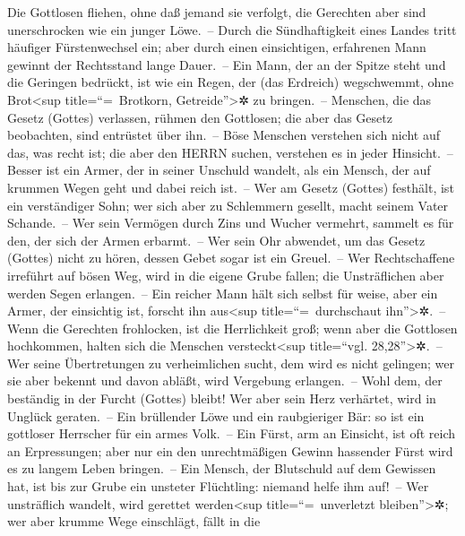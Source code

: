 Die Gottlosen fliehen, ohne daß jemand sie verfolgt, die
Gerechten aber sind unerschrocken wie ein junger Löwe.~--
Durch die Sündhaftigkeit eines Landes tritt häufiger
Fürstenwechsel ein; aber durch einen einsichtigen, erfahrenen Mann
gewinnt der Rechtsstand lange Dauer.~-- Ein Mann, der an
der Spitze steht und die Geringen bedrückt, ist wie ein Regen, der (das
Erdreich) wegschwemmt, ohne Brot\textless sup title=``=~Brotkorn,
Getreide''\textgreater✲ zu bringen.~-- Menschen, die das
Gesetz (Gottes) verlassen, rühmen den Gottlosen; die aber das Gesetz
beobachten, sind entrüstet über ihn.~-- Böse Menschen
verstehen sich nicht auf das, was recht ist; die aber den HERRN suchen,
verstehen es in jeder Hinsicht.~-- Besser ist ein Armer,
der in seiner Unschuld wandelt, als ein Mensch, der auf krummen Wegen
geht und dabei reich ist.~-- Wer am Gesetz (Gottes)
festhält, ist ein verständiger Sohn; wer sich aber zu Schlemmern
gesellt, macht seinem Vater Schande.~-- Wer sein Vermögen
durch Zins und Wucher vermehrt, sammelt es für den, der sich der Armen
erbarmt.~-- Wer sein Ohr abwendet, um das Gesetz (Gottes)
nicht zu hören, dessen Gebet sogar ist ein Greuel.~-- Wer
Rechtschaffene irreführt auf bösen Weg, wird in die eigene Grube fallen;
die Unsträflichen aber werden Segen erlangen.~-- Ein
reicher Mann hält sich selbst für weise, aber ein Armer, der einsichtig
ist, forscht ihn aus\textless sup title=``=~durchschaut
ihn''\textgreater✲.~-- Wenn die Gerechten frohlocken, ist
die Herrlichkeit groß; wenn aber die Gottlosen hochkommen, halten sich
die Menschen versteckt\textless sup title=``vgl.
28,28''\textgreater✲.~-- Wer seine Übertretungen zu
verheimlichen sucht, dem wird es nicht gelingen; wer sie aber bekennt
und davon abläßt, wird Vergebung erlangen.~-- Wohl dem,
der beständig in der Furcht (Gottes) bleibt! Wer aber sein Herz
verhärtet, wird in Unglück geraten.~-- Ein brüllender
Löwe und ein raubgieriger Bär: so ist ein gottloser Herrscher für ein
armes Volk.~-- Ein Fürst, arm an Einsicht, ist oft reich
an Erpressungen; aber nur ein den unrechtmäßigen Gewinn hassender Fürst
wird es zu langem Leben bringen.~-- Ein Mensch, der
Blutschuld auf dem Gewissen hat, ist bis zur Grube ein unsteter
Flüchtling: niemand helfe ihm auf!~-- Wer unsträflich
wandelt, wird gerettet werden\textless sup title=``=~unverletzt
bleiben''\textgreater✲; wer aber krumme Wege einschlägt, fällt in die

